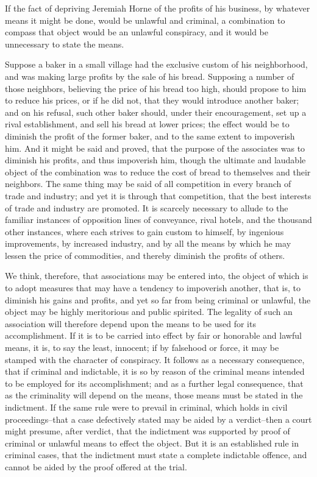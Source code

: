 \documentclass[
  letterpaper,
  11pt,
  DIV=9,
  openright]{scrbook}
\begin{document}
If the fact of depriving Jeremiah Horne of the profits of his business,
by whatever means it might be done, would be unlawful and criminal, a
combination to compass that object would be an unlawful conspiracy, and
it would be unnecessary to state the means.

Suppose a baker in a small village had the exclusive custom of his
neighborhood, and was making large profits by the sale of his bread.
Supposing a number of those neighbors, believing the price of his bread
too high, should propose to him to reduce his prices, or if he did not,
that they would introduce another baker; and on his refusal, such other
baker should, under their encouragement, set up a rival establishment,
and sell his bread at lower prices; the effect would be to diminish the
profit of the former baker, and to the same extent to impoverish him.
And it might be said and proved, that the purpose of the associates was
to diminish his profits, and thus impoverish him, though the ultimate
and laudable object of the combination was to reduce the cost of bread
to themselves and their neighbors. The same thing may be said of all
competition in every branch of trade and industry; and yet it is through
that competition, that the best interests of trade and industry are
promoted. It is scarcely necessary to allude to the familiar instances
of opposition lines of conveyance, rival hotels, and the thousand other
instances, where each strives to gain custom to himself, by ingenious
improvements, by increased industry, and by all the means by which he
may lessen the price of commodities, and thereby diminish the profits of
others.

We think, therefore, that associations may be entered into, the object
of which is to adopt measures that may have a tendency to impoverish
another, that is, to diminish his gains and profits, and yet so far from
being criminal or unlawful, the object may be highly meritorious and
public spirited. The legality of such an association will therefore
depend upon the means to be used for its accomplishment. If it is to be
carried into effect by fair or honorable and lawful means, it is, to say
the least, innocent; if by falsehood or force, it may be stamped with
the character of conspiracy. It follows as a necessary consequence, that
if criminal and indictable, it is so by reason of the criminal means
intended to be employed for its accomplishment; and as a further legal
consequence, that as the criminality will depend on the means, those
means must be stated in the indictment. If the same rule were to prevail
in criminal, which holds in civil proceedings--that a case defectively
stated may be aided by a verdict--then a court might presume, after
verdict, that the indictment was supported by proof of criminal or
unlawful means to effect the object. But it is an established rule in
criminal cases, that the indictment must state a complete indictable
offence, and cannot be aided by the proof offered at the trial.
\end{document}
